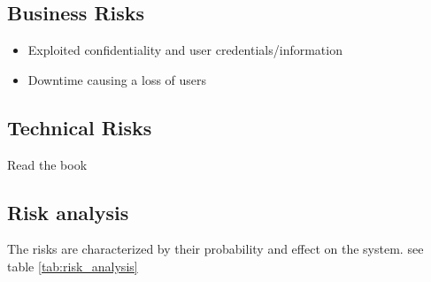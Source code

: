 \documentclass[a4paper]{article}
\begin{document}
\subsection{Business Risks}
\begin{itemize}
\item Exploited confidentiality and user credentials/information
\item Downtime causing a loss of users
 

\end{itemize}

\subsection{Technical Risks}
Read the book

\subsection{Risk analysis}
The risks are characterized by their probability and effect on the system. see table \ref{tab:risk_analysis}
\end{document}
